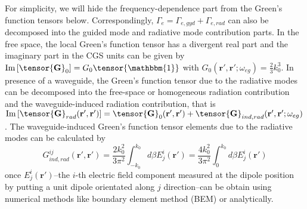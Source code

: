 \documentclass[preprint,aps,pra,onecolumn,superscriptaddress]{revtex4-1} %
\def\br{\mathbf{r}}
\begin{document}
\begin{appendix}
For simplicity, we will hide the frequency-dependence part from the Green's function tensors below.
Correspondingly, $ \Gamma_e=\Gamma_{e,gyd}+\Gamma_{e,rad} $ can also be decomposed into the guided mode and radiative mode contribution parts. 
In the free space, the local Green's function tensor has a divergent real part and the imaginary part in the CGS units can be given by 
$\mathrm{Im}\left[\tensor{\mathbf{G}}_0\right]=G_0\tensor{\mathbbm{1}}$ with $G_0(\mathbf{r}',\mathbf{r}';\omega_{eg})=\frac{2}{3}k_0^3$.
In presence of a waveguide, the Green's function tensor due to the radiative modes can be decomposed into the free-space or homogeneous radiation contribution and the waveguide-induced radiation contribution, that is $ \mathrm{Im}\left[\tensor{\mathbf{G}}_{rad}(\br',\br')\right]=\tensor{\mathbf{G}}_0(\br',\br')+\tensor{\mathbf{G}}_{ind,rad}(\br',\br';\omega_{eg}) $.
The waveguide-induced Green's function tensor elements due to the radiative modes can be calculated by
$$G_{ind,rad}^{ij}(\mathbf{r}',\mathbf{r}')=\frac{2k_0^2}{3\pi^2}\int_{-k_0}^{k_0} d\beta E_j^i(\mathbf{r}')=\frac{4k_0^2}{3\pi^2}\int_{0}^{k_0} d\beta E_j^i(\mathbf{r}')$$
once $ E_j^i(\mathbf{r}') $--the $i$-th electric field component measured at the dipole position by putting a unit dipole orientated along $j$ direction--can be obtain using numerical methods like boundary element method (BEM) or analytically.


\end{appendix}
\end{document}
